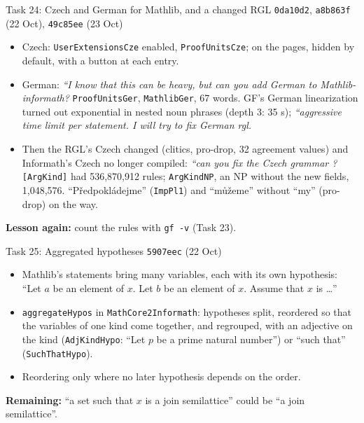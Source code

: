 \documentclass[10pt,aspectratio=169]{beamer}
\newcommand{\bad}[1]{\textcolor{warn}{#1}}
\newcommand{\ok}[1]{\textcolor{good}{#1}}
\newcommand{\commit}[1]{\texttt{\footnotesize #1}}
\begin{document}
\begin{frame}{Task 24: Czech and German for Mathlib, and a changed RGL}
  \commit{0da10d2}, \commit{a8b863f} (22 Oct), \commit{49c85ee} (23 Oct)
  \begin{itemize}\small
    \item Czech: \texttt{UserExtensionsCze} enabled, \texttt{ProofUnitsCze}; on the pages,
          hidden by default, with a button at each entry.
    \item German: \textit{``I know that this can be heavy, but can you add German to
          Mathlib-informath?} \texttt{ProofUnitsGer}, \texttt{MathlibGer}, 67 words. GF's
          German linearization turned out exponential in nested noun phrases (depth 3: 35 s);
          \textit{``aggressive time limit per statement. I will try to fix German rgl.}
    \item Then the RGL's Czech changed (clitics, pro-drop, 32 agreement values) and
          Informath's Czech no longer compiled: \textit{``can you fix the Czech grammar ?}
          \texttt{[ArgKind]} had \bad{536,870,912} rules; \texttt{ArgKindNP}, an NP without
          the new fields, \ok{1,048,576}. ``Předpokládejme'' (\texttt{ImpPl1}) and ``můžeme''
          without ``my'' (pro-drop) on the way.
  \end{itemize}
  \textbf{Lesson again:} count the rules with \texttt{gf -v} (Task 23).
\end{frame}

\begin{frame}{Task 25: Aggregated hypotheses}
  \commit{5907eec} (22 Oct)
  \begin{itemize}\small
    \item Mathlib's statements bring many variables, each with its own hypothesis:
          ``Let $a$ be an element of $x$. Let $b$ be an element of $x$. Assume that
          $x$ is \dots''
    \item \texttt{aggregateHypos} in \texttt{MathCore2Informath}: hypotheses split,
          reordered so that the variables of one kind come together, and regrouped,
          with an adjective on the kind (\texttt{AdjKindHypo}: ``Let $p$ be a prime natural
          number'') or ``such that'' (\texttt{SuchThatHypo}).
    \item Reordering only where no later hypothesis depends on the order.
  \end{itemize}
  \textbf{Remaining:} \bad{``a set such that $x$ is a join semilattice''} could be ``a join
  semilattice''.
\end{frame}
\end{document}
